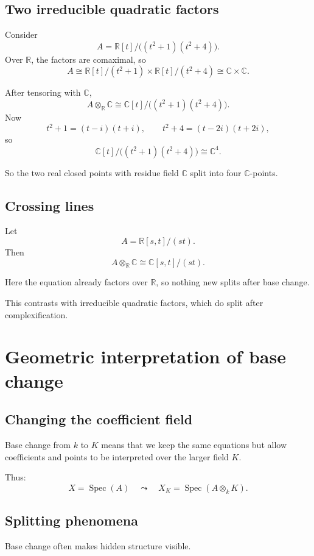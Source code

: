 \documentclass[12pt,a4paper]{article}
\theoremstyle{notespace}
\newcommand{\Spec}{\operatorname{Spec}}
\newcommand{\R}{\mathbb R}
\newcommand{\C}{\mathbb C}
\theoremstyle{definition}
\begin{document}
	\subsection{Two irreducible quadratic factors}
	
	Consider
	\[
	A=\R[t]/\bigl((t^2+1)(t^2+4)\bigr).
	\]
	Over \(\R\), the factors are comaximal, so
	\[
	A\cong \R[t]/(t^2+1)\times \R[t]/(t^2+4)\cong \C\times \C.
	\]
	
	After tensoring with \(\C\),
	\[
	A\otimes_{\R}\C
	\cong
	\C[t]/\bigl((t^2+1)(t^2+4)\bigr).
	\]
	Now
	\[
	t^2+1=(t-i)(t+i),
	\qquad
	t^2+4=(t-2i)(t+2i),
	\]
	so
	\[
	\C[t]/\bigl((t^2+1)(t^2+4)\bigr)\cong \C^4.
	\]
	
	So the two real closed points with residue field \(\C\) split into four \(\C\)-points.
	
	\subsection{Crossing lines}
	
	Let
	\[
	A=\R[s,t]/(st).
	\]
	Then
	\[
	A\otimes_{\R}\C
	\cong
	\C[s,t]/(st).
	\]
	
	Here the equation already factors over \(\R\), so nothing new splits after base change.
	
	This contrasts with irreducible quadratic factors, which do split after complexification.
	
	\section{Geometric interpretation of base change}
	
	\subsection{Changing the coefficient field}
	
	Base change from \(k\) to \(K\) means that we keep the same equations but allow coefficients and points to be interpreted over the larger field \(K\).
	
	Thus:
	\[
	X=\Spec(A)
	\quad\leadsto\quad
	X_K=\Spec(A\otimes_k K).
	\]
	
	\subsection{Splitting phenomena}
	
	Base change often makes hidden structure visible.
	
\end{document}
